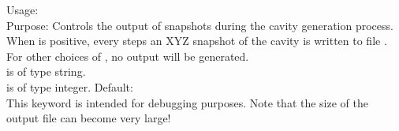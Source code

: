 {
  \noindent
  Usage:  
      \\[1.0ex] 
  Purpose: Controls the output of snapshots during the 
    cavity generation process. When  
    is positive, every  steps an XYZ snapshot 
    of the cavity is written to file . 
    For other choices of , no output will 
    be generated. \\[1.0ex]
   is of type string. \\
   is of type integer. Default:  \\
}
This keyword is intended for debugging purposes. Note that 
the size of the output file can become very large! 


